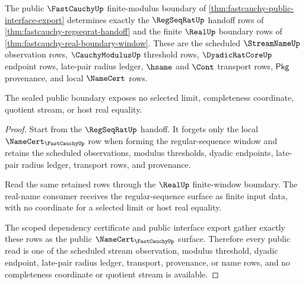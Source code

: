 \begin{theorem}
\label{thm:fastcauchy-public-regseqrat-real-seal}
The public $\FastCauchyUp$ finite-modulus boundary of
\autoref{thm:fastcauchy-public-interface-export} determines exactly the
$\RegSeqRatUp$ handoff rows of
\autoref{thm:fastcauchy-regseqrat-handoff} and the finite $\RealUp$ boundary
rows of \autoref{thm:fastcauchy-real-boundary-window}. These are the scheduled
$\StreamNameUp$ observation rows, $\CauchyModulusUp$ threshold rows,
$\DyadicRatCoreUp$ endpoint rows, late-pair radius ledger, $\hsame$ and
$\Cont$ transport rows, $\mathsf{Pkg}$ provenance, and local $\NameCert$ rows.

The sealed public boundary exposes no selected limit, completeness coordinate,
quotient stream, or host real equality.
\end{theorem}
\begin{proof}
Start from the $\RegSeqRatUp$ handoff. It forgets only the local
$\NameCert_{\FastCauchyUp}$ row when forming the regular-sequence window and
retains the scheduled observations, modulus thresholds, dyadic endpoints,
late-pair radius ledger, transport rows, and provenance.

Read the same retained rows through the $\RealUp$ finite-window boundary. The
real-name consumer receives the regular-sequence surface as finite input data,
with no coordinate for a selected limit or host real equality.

The scoped dependency certificate and public interface export gather exactly
these rows as the public $\NameCert_{\FastCauchyUp}$ surface. Therefore every
public read is one of the scheduled stream observation, modulus threshold,
dyadic endpoint, late-pair radius ledger, transport, provenance, or name rows,
and no completeness coordinate or quotient stream is available.
\end{proof}

